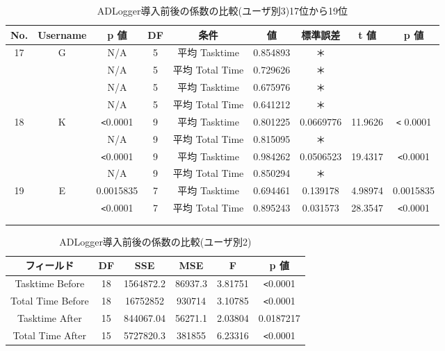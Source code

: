 \begin{table}[ht]
\begin{center}
 \caption{ADLogger導入前後の係数の比較(ユーザ別3)17位から19位}
\begin{tabular}{|c|c|c|c|c|c|c|c|c|} \hline
No. & Username & p 値 & DF & 条件 & 値 & 標準誤差 & t 値 & p 値 \\\hline
17 & G & N/A & 5 & 平均 Tasktime & 0.854893 & ＊ &  &  \\\hline
 &  & N/A & 5 & 平均 Total Time & 0.729626 & ＊ &  &\\\hline
 &  & N/A & 5 & 平均 Tasktime & 0.675976 & ＊ &  & \\\hline
 &  & N/A & 5 & 平均 Total Time & 0.641212 & ＊ &  &  \\\hline
18 & K & \verb|<|0.0001 & 9 & 平均 Tasktime & 0.801225 & 0.0669776 & 11.9626 &\verb|<| 0.0001 \\\hline
 &  & N/A & 9 & 平均 Total Time & 0.815095 & ＊ &  & \\\hline
 &  &  \verb|<|0.0001 & 9 & 平均 Tasktime & 0.984262 & 0.0506523 & 19.4317 & \verb|<|0.0001 \\\hline
 &  & N/A & 9 & 平均 Total Time & 0.850294 & ＊ &  &\\\hline
19 & E & 0.0015835 & 7 & 平均 Tasktime & 0.694461 & 0.139178 & 4.98974 & 0.0015835\\\hline
 &  & \verb|<|0.0001 & 7 & 平均 Total Time & 0.895243 & 0.031573 & 28.3547 &\verb|<|0.0001\\\hline
 &  &  &  &  &  &  &  &  \\\hline
 &  &  &  &  &  &  &  & \\\hline
\end{tabular}
  \label{tb:test6}
\end{center}
\end{table}

\begin{table}[ht]
\begin{center}
 \caption{ADLogger導入前後の係数の比較(ユーザ別2)}
\begin{tabular}{|c|c|c|c|c|c|} \hline
フィールド & DF & SSE & MSE & F & p 値 \\\hline
Tasktime Before & 18 & 1564872.2 & 86937.3 & 3.81751 & \verb|<|0.0001 \\\hline
Total Time Before & 18 & 16752852 & 930714 & 3.10785 &\verb|<|0.0001 \\\hline
Tasktime After & 15 & 844067.04 & 56271.1 & 2.03804 & 0.0187217 \\\hline
Total Time After & 15 & 5727820.3 & 381855 & 6.23316 & \verb|<|0.0001\\\hline
\end{tabular}
  \label{tb:test7}
\end{center}
\end{table}

